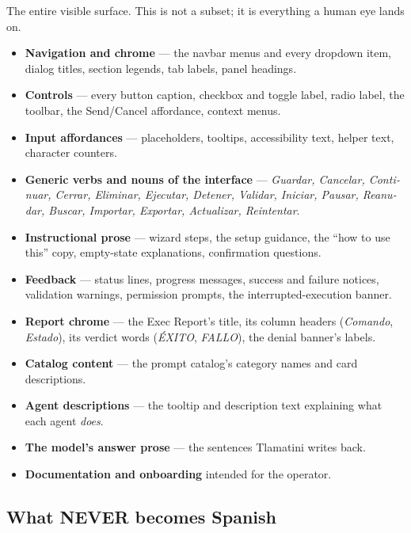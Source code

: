 The entire visible surface. This is not a subset; it is everything a human eye lands on.

\begin{itemize}
  \item \textbf{Navigation and chrome} --- the navbar menus and every dropdown item, dialog titles, section legends, tab labels, panel headings.
  \item \textbf{Controls} --- every button caption, checkbox and toggle label, radio label, the toolbar, the Send/Cancel affordance, context menus.
  \item \textbf{Input affordances} --- placeholders, tooltips,  accessibility text, helper text, character counters.
  \item \textbf{Generic verbs and nouns of the interface} --- \foreignlanguage{spanish}{\emph{Guardar, Cancelar, Continuar, Cerrar, Eliminar, Ejecutar, Detener, Validar, Iniciar, Pausar, Reanudar, Buscar, Importar, Exportar, Actualizar, Reintentar}}.
  \item \textbf{Instructional prose} --- wizard steps, the setup guidance, the ``how to use this'' copy, empty-state explanations, confirmation questions.
  \item \textbf{Feedback} --- status lines, progress messages, success and failure notices, validation warnings, permission prompts, the interrupted-execution banner.
  \item \textbf{Report chrome} --- the Exec Report's title, its column headers (\foreignlanguage{spanish}{\emph{Comando}}, \foreignlanguage{spanish}{\emph{Estado}}), its verdict words (\foreignlanguage{spanish}{\emph{ÉXITO}}, \foreignlanguage{spanish}{\emph{FALLO}}), the denial banner's labels.
  \item \textbf{Catalog content} --- the prompt catalog's category names and card descriptions.
  \item \textbf{Agent descriptions} --- the tooltip and description text explaining what each agent \emph{does}.
  \item \textbf{The model's answer prose} --- the sentences Tlamatini writes back.
  \item \textbf{Documentation and onboarding} intended for the operator.
\end{itemize}

\subsection{What NEVER becomes Spanish}
\label{sec:what-never-becomes-spanish}

